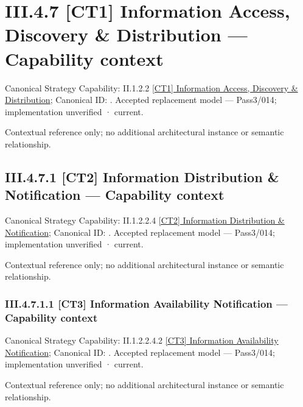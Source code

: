 \section*{III.4.7 [CT1] Information Access, Discovery \& Distribution — Capability context}
\label{navigation:III.4.7}

{\small Canonical Strategy Capability: II.1.2.2 \hyperref[element:73cd0e24923a4c8b9678654a7cf0d81a]{[CT1] Information Access, Discovery \& Distribution}; Canonical ID: \texttt{}. Accepted replacement model — Pass3/014; implementation unverified · current.}\par
Contextual reference only; no additional architectural instance or semantic relationship.\par
\subsection*{III.4.7.1 [CT2] Information Distribution \& Notification — Capability context}
\label{navigation:III.4.7.1}

{\small Canonical Strategy Capability: II.1.2.2.4 \hyperref[element:1c2aad9aca7242149b4f30045c42711f]{[CT2] Information Distribution \& Notification}; Canonical ID: \texttt{}. Accepted replacement model — Pass3/014; implementation unverified · current.}\par
Contextual reference only; no additional architectural instance or semantic relationship.\par
\subsubsection*{III.4.7.1.1 [CT3] Information Availability Notification — Capability context}
\label{navigation:III.4.7.1.1}

{\small Canonical Strategy Capability: II.1.2.2.4.2 \hyperref[element:c159dcc35e0f43418af6c6176e271ca7]{[CT3] Information Availability Notification}; Canonical ID: \texttt{}. Accepted replacement model — Pass3/014; implementation unverified · current.}\par
Contextual reference only; no additional architectural instance or semantic relationship.\par
